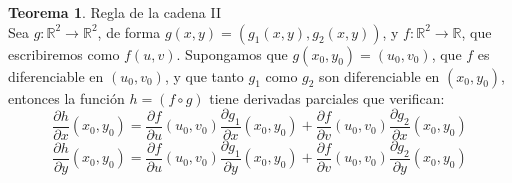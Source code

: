 \documentclass[10pt]{article}
\theoremstyle{definition}
\newtheorem{theorem}{Teorema}[section]
\begin{document}
\begin{theorem}{Regla de la cadena II}
    \\Sea $g:\mathbb{R}^2\to\mathbb{R}^2$, de forma $g(x,y)=(g_1(x,y),g_2(x,y))$, y $f:\mathbb{R}^2\to\mathbb{R}$, que escribiremos como $f(u,v)$. Supongamos que $g(x_0,y_0)=(u_0,v_0)$, que $f$ es diferenciable en $(u_0,v_0)$, y que tanto $g_1$ como $g_2$ son diferenciable en $(x_0,y_0)$, entonces la función $h=(f\circ g)$ tiene derivadas parciales que verifican:$$\frac{\partial h}{\partial x}(x_0,y_0)=\frac{\partial f}{\partial u}(u_0,v_0)\frac{\partial g_1}{\partial x}(x_0,y_0)+\frac{\partial f}{\partial v}(u_0,v_0)\frac{\partial g_2}{\partial x}(x_0,y_0)$$
    $$\frac{\partial h}{\partial y}(x_0,y_0)=\frac{\partial f}{\partial u}(u_0,v_0)\frac{\partial g_1}{\partial y}(x_0,y_0)+\frac{\partial f}{\partial v}(u_0,v_0)\frac{\partial g_2}{\partial y}(x_0,y_0)$$
\end{theorem}
\end{document}
